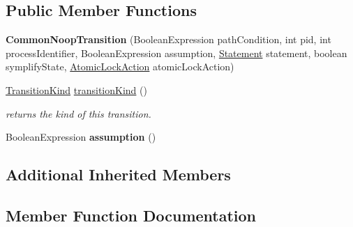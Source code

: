 \subsection*{Public Member Functions}
\begin{DoxyCompactItemize}
\item 
\hypertarget{classedu_1_1udel_1_1cis_1_1vsl_1_1civl_1_1semantics_1_1common_1_1CommonNoopTransition_a8d437ae8f271d607e6cb906561d5285d}{}{\bfseries Common\+Noop\+Transition} (Boolean\+Expression path\+Condition, int pid, int process\+Identifier, Boolean\+Expression assumption, \hyperlink{interfaceedu_1_1udel_1_1cis_1_1vsl_1_1civl_1_1model_1_1IF_1_1statement_1_1Statement}{Statement} statement, boolean symplify\+State, \hyperlink{enumedu_1_1udel_1_1cis_1_1vsl_1_1civl_1_1semantics_1_1IF_1_1Transition_1_1AtomicLockAction}{Atomic\+Lock\+Action} atomic\+Lock\+Action)\label{classedu_1_1udel_1_1cis_1_1vsl_1_1civl_1_1semantics_1_1common_1_1CommonNoopTransition_a8d437ae8f271d607e6cb906561d5285d}

\item 
\hyperlink{enumedu_1_1udel_1_1cis_1_1vsl_1_1civl_1_1semantics_1_1IF_1_1Transition_1_1TransitionKind}{Transition\+Kind} \hyperlink{classedu_1_1udel_1_1cis_1_1vsl_1_1civl_1_1semantics_1_1common_1_1CommonNoopTransition_abcc3912b7d9e6247c187f3f4e588842c}{transition\+Kind} ()
\begin{DoxyCompactList}\small\item\em returns the kind of this transition. \end{DoxyCompactList}\item 
\hypertarget{classedu_1_1udel_1_1cis_1_1vsl_1_1civl_1_1semantics_1_1common_1_1CommonNoopTransition_acc60d2c7c17e07b4dbb4abe2aceabed7}{}Boolean\+Expression {\bfseries assumption} ()\label{classedu_1_1udel_1_1cis_1_1vsl_1_1civl_1_1semantics_1_1common_1_1CommonNoopTransition_acc60d2c7c17e07b4dbb4abe2aceabed7}

\end{DoxyCompactItemize}
\subsection*{Additional Inherited Members}


\subsection{Member Function Documentation}
\hypertarget{classedu_1_1udel_1_1cis_1_1vsl_1_1civl_1_1semantics_1_1common_1_1CommonNoopTransition_abcc3912b7d9e6247c187f3f4e588842c}{}
